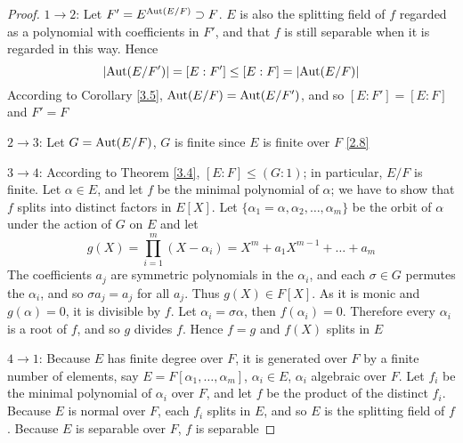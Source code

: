 \documentclass[11pt]{article}
\begin{document}
\begin{proof}
\(1\to 2\): Let \(F'=E^{\operatorname{\text{Aut}}(E/F)}\supset F\). \(E\) is also the splitting field of \(f\) regarded as a
polynomial with coefficients in \(F'\), and that \(f\) is still separable when it is regarded in
this way. Hence
\begin{equation*}
\abs{\Aut(E/F')}=[E:F']\le[E:F]=\abs{\Aut(E/F)}
\end{equation*}
According to Corollary \ref{3.5}, \(\operatorname{\text{Aut}}(E/F)=\operatorname{\text{Aut}}(E/F')\), and so \([E:F']=[E:F]\) and \(F'=F\)

\(2\to 3\): Let \(G=\operatorname{\text{Aut}}(E/F)\), \(G\) is finite since \(E\) is finite over \(F\) \ref{2.8}

\(3\to 4\): According to Theorem \ref{3.4}, \([E:F]\le(G:1)\); in particular, \(E/F\) is finite.
Let \(\alpha\in E\), and let \(f\) be the minimal polynomial of \(\alpha\); we have to show that \(f\) splits
into distinct factors in \(E[X]\). Let \(\{\alpha_1=\alpha,\alpha_2,\dots,\alpha_m\}\) be the orbit of \(\alpha\) under the action
of \(G\) on \(E\)
and let
\begin{equation*}
g(X)=\prod_{i=1}^m(X-\alpha_i)=X^m+a_1X^{m-1}+\dots+a_m
\end{equation*}
The coefficients \(a_j\) are symmetric polynomials in the \(\alpha_i\), and each \(\sigma\in G\) permutes
the \(\alpha_i\), and so \(\sigma a_j=a_j\) for all \(a_j\). Thus \(g(X)\in F[X]\). As it is monic
and \(g(\alpha)=0\), it is divisible by \(f\). Let \(\alpha_i=\sigma\alpha\), then \(f(\alpha_i)=0\). Therefore
every \(\alpha_i\) is a root of \(f\), and so \(g\) divides \(f\). Hence \(f=g\) and \(f(X)\) splits
in \(E\)

\(4\to 1\): Because \(E\) has finite degree over \(F\), it is generated over \(F\) by a finite
number of elements, say \(E=F[\alpha_1,\dots,\alpha_m]\), \(\alpha_i\in E\), \(\alpha_i\) algebraic over \(F\). Let \(f_i\) be
the minimal polynomial of \(\alpha_i\) over \(F\), and let \(f\) be the product of the
distinct \(f_i\). Because \(E\) is normal over \(F\), each \(f_i\) splits in \(E\), and so \(E\)
is the splitting field of \(f\). Because \(E\) is separable over \(F\), \(f\) is separable
\end{proof}
\end{document}
